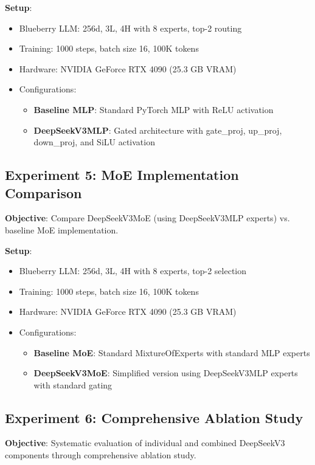 \documentclass[11pt,a4paper]{article}
\begin{document}
\textbf{Setup}:
\begin{itemize}
    \item Blueberry LLM: 256d, 3L, 4H with 8 experts, top-2 routing
    \item Training: 1000 steps, batch size 16, 100K tokens
    \item Hardware: NVIDIA GeForce RTX 4090 (25.3 GB VRAM)
    \item Configurations:
    \begin{itemize}
        \item \textbf{Baseline MLP}: Standard PyTorch MLP with ReLU activation
        \item \textbf{DeepSeekV3MLP}: Gated architecture with gate\_proj, up\_proj, down\_proj, and SiLU activation
    \end{itemize}
\end{itemize}

\subsection{Experiment 5: MoE Implementation Comparison}

\textbf{Objective}: Compare DeepSeekV3MoE (using DeepSeekV3MLP experts) vs. baseline MoE implementation.

\textbf{Setup}:
\begin{itemize}
    \item Blueberry LLM: 256d, 3L, 4H with 8 experts, top-2 selection
    \item Training: 1000 steps, batch size 16, 100K tokens
    \item Hardware: NVIDIA GeForce RTX 4090 (25.3 GB VRAM)
    \item Configurations:
    \begin{itemize}
        \item \textbf{Baseline MoE}: Standard MixtureOfExperts with standard MLP experts
        \item \textbf{DeepSeekV3MoE}: Simplified version using DeepSeekV3MLP experts with standard gating
    \end{itemize}
\end{itemize}

\subsection{Experiment 6: Comprehensive Ablation Study}

\textbf{Objective}: Systematic evaluation of individual and combined DeepSeekV3 components through comprehensive ablation study.
\end{document}
